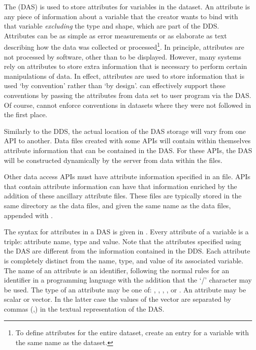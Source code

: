 The  (DAS) is used to store
attributes for variables in the dataset. An attribute is any piece of
information about a variable that the creator wants to bind with that
variable \emph{excluding} the type and shape, which are
part of the DDS.  Attributes can be as simple as error measurements or
as elaborate as text describing how the data was collected or
processed\footnote{To define attributes for the entire dataset, create
  an entry for a variable with the same name as the dataset.}. In
principle, attributes are not processed by software, other than to be
displayed. However, many systems rely on attributes to store extra
information that is necessary to perform certain manipulations of
data. In effect, attributes are used to store information that is used
`by convention' rather than `by design'. \opendap can effectively support
these conventions by passing the attributes from data set to user
program via the DAS\@. Of course, \opendap cannot enforce conventions in
datasets where they were not followed in the first place.

Similarly to the DDS, the actual location of the DAS storage will vary
from one API to another. Data files created with some APIs will
contain within themselves attribute information that can be contained
in the DAS.  For
these APIs, the DAS will be constructed dynamically by the \opendap server
from data within the files.  

Other data access APIs must have attribute information specified in an
 file.  APIs that contain attribute information
can have that information enriched by the addition of these ancillary
attribute files.  These files are typically stored in the same
directory as the data files, and given the same name as the data
files, appended with .

The syntax for attributes in a DAS is given in
. Every attribute of a variable is a triple:
attribute name, type and value.  Note that the attributes specified
using the DAS are different from the information contained in the
DDS\@. Each attribute is completely distinct from the name, type,
and value of its associated variable. The name of an
attribute is an identifier, following the normal rules for an
identifier in a programming language with the addition that the `/'
character may be used. The type of an attribute may be one of:
, , , ,
 or . An attribute may be scalar or vector.
In the latter case the values of the vector are separated by commas
(,) in the textual representation of the DAS\@.

